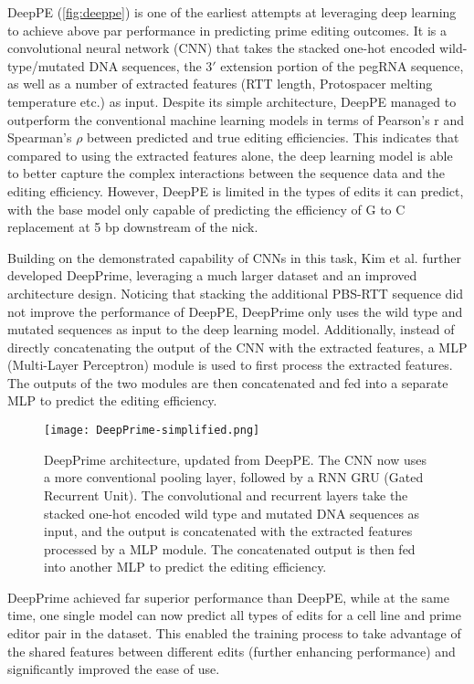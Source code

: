 DeepPE (\autoref{fig:deeppe}) is one of the earliest attempts at leveraging deep learning to achieve above par performance in predicting prime editing outcomes\cite{kimPredictingEfficiencyPrime2021}. It is a convolutional neural network (CNN) that takes the stacked one-hot encoded wild-type/mutated DNA sequences, the $3'$ extension portion of the pegRNA sequence, as well as a number of extracted features (RTT length, Protospacer melting temperature etc.) as input. Despite its simple architecture, DeepPE managed to outperform the conventional machine learning models in terms of Pearson's r and Spearman's $\rho$ between predicted and true editing efficiencies. This indicates that compared to using the extracted features alone, the deep learning model is able to better capture the complex interactions between the sequence data and the editing efficiency. However, DeepPE is limited in the types of edits it can predict, with the base model only capable of predicting the efficiency of G to C replacement at 5 bp downstream of the nick.

Building on the demonstrated capability of CNNs in this task, Kim et al. further developed DeepPrime, leveraging a much larger dataset and an improved architecture design\cite{yuPredictionEfficienciesDiverse2023}.
Noticing that stacking the additional PBS-RTT sequence did not improve the performance of DeepPE, DeepPrime only uses the wild type and mutated sequences as input to the deep learning model. Additionally, instead of directly concatenating the output of the CNN with the extracted features, a MLP (Multi-Layer Perceptron) module is used to first process the extracted features.
The outputs of the two modules are then concatenated and fed into a separate MLP to predict the editing efficiency.

\begin{figure}
    \centering
    \texttt{[image: DeepPrime-simplified.png]}
    \caption[DeepPrime architecture]{DeepPrime architecture, updated from DeepPE. The CNN now uses a more conventional pooling layer, followed by a RNN GRU (Gated Recurrent Unit). The convolutional and recurrent layers take the stacked one-hot encoded wild type and mutated DNA sequences as input, and the output is concatenated with the extracted features processed by a MLP module. The concatenated output is then fed into another MLP to predict the editing efficiency.}
    \label{fig:deepprime}
\end{figure}

DeepPrime achieved far superior performance than DeepPE, while at the same time, one single model can now predict all types of edits for a cell line and prime editor pair in the dataset. This enabled the training process to take advantage of the shared features between different edits (further enhancing performance) and significantly improved the ease of use.

